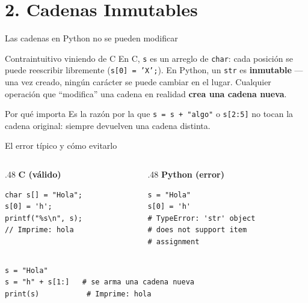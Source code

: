 \documentclass{beamer}
\begin{document}
\section{2. Cadenas Inmutables}

\begin{frame}{Las cadenas en Python no se pueden modificar}
  \begin{alertblock}{Contraintuitivo viniendo de C}
    En C, \texttt{s} es un arreglo de \texttt{char}: cada posición se
    puede reescribir libremente (\texttt{s[0] = 'X';}). En Python, un
    \texttt{str} es \textbf{inmutable} — una vez creado, ningún carácter
    se puede cambiar en el lugar. Cualquier operación que ``modifica'' una
    cadena en realidad \textbf{crea una cadena nueva}.
  \end{alertblock}
  \begin{block}{Por qué importa}
    Es la razón por la que \texttt{s = s + "algo"} o \texttt{s[2:5]} no
    tocan la cadena original: siempre devuelven una cadena distinta.
  \end{block}
\end{frame}

\begin{frame}[fragile]{El error típico y cómo evitarlo}
  \begin{columns}[T]
    \begin{column}{.48\textwidth}
      \centering\textbf{C (válido)}
      \begin{verbatim}
char s[] = "Hola";
s[0] = 'h';
printf("%s\n", s);
// Imprime: hola
      \end{verbatim}
    \end{column}
    \begin{column}{.48\textwidth}
      \centering\textbf{Python (error)}
      \begin{verbatim}
s = "Hola"
s[0] = 'h'
# TypeError: 'str' object
# does not support item
# assignment
      \end{verbatim}
    \end{column}
  \end{columns}
  \vspace{0.4em}
  \begin{verbatim}
s = "Hola"
s = "h" + s[1:]   # se arma una cadena nueva
print(s)           # Imprime: hola
  \end{verbatim}
\end{frame}
\end{document}
